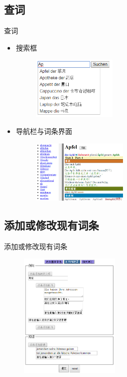 \documentclass[notheorems,xetex]{beamer}
\begin{document}
\subsection{查词}
\begin{frame}{查词}

\begin{itemize}
	\item 搜索框
     \begin{figure}
	  \centering
	  \includegraphics[height=3cm]{search1.png}
	\end{figure}	
	\item 导航栏与词条界面
     \begin{figure}
	\centering
	\includegraphics[height=3cm]{search2.png}
	\end{figure}
\end{itemize}
\begin{figure}
\end{figure}
\end{frame}
\subsection{添加或修改现有词条}
\begin{frame}{添加或修改现有词条}
\begin{figure}
	\includegraphics[height=6cm]{edit.png}
\end{figure}
\end{frame}
\end{document}
